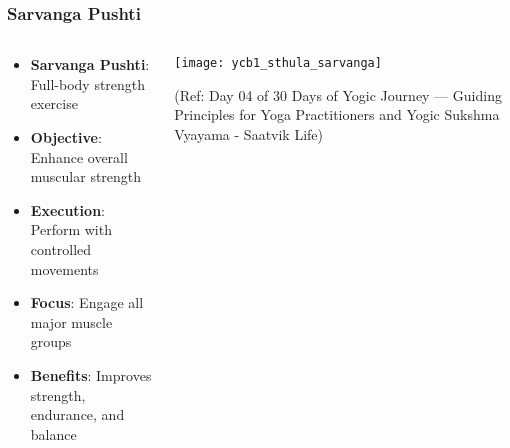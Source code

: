 
\begin{frame}[fragile]\frametitle{Sarvanga Pushti}
\begin{columns}
    \begin{column}[T]{0.5\linewidth}
      \begin{itemize}
		\item \textbf{Sarvanga Pushti}: Full-body strength exercise
		\item \textbf{Objective}: Enhance overall muscular strength
		\item \textbf{Execution}: Perform with controlled movements
		\item \textbf{Focus}: Engage all major muscle groups
		\item \textbf{Benefits}: Improves strength, endurance, and balance
	  \end{itemize}
    \end{column}
    \begin{column}[T]{0.5\linewidth}
		\begin{center}
		\texttt{[image: ycb1\_sthula\_sarvanga]}
		
		{\tiny (Ref: Day 04 of 30 Days of Yogic Journey — Guiding Principles for Yoga Practitioners and Yogic Sukshma Vyayama - Saatvik Life)}	
		\end{center}	
    \end{column}
\end{columns}
\end{frame}

